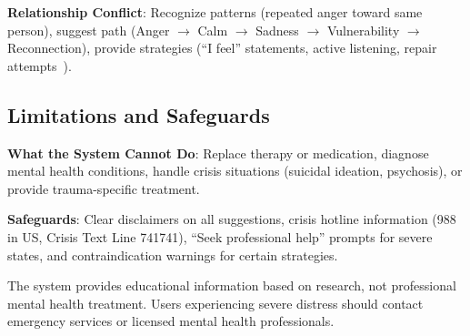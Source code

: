 \textbf{Relationship Conflict}: Recognize patterns (repeated anger toward same person), suggest path (Anger $\rightarrow$ Calm $\rightarrow$ Sadness $\rightarrow$ Vulnerability $\rightarrow$ Reconnection), provide strategies (``I feel'' statements, active listening, repair attempts~\cite{gottman2015}).

\subsection{Limitations and Safeguards}

\textbf{What the System Cannot Do}: Replace therapy or medication, diagnose mental health conditions, handle crisis situations (suicidal ideation, psychosis), or provide trauma-specific treatment.

\textbf{Safeguards}: Clear disclaimers on all suggestions, crisis hotline information (988 in US, Crisis Text Line 741741), ``Seek professional help'' prompts for severe states, and contraindication warnings for certain strategies.

The system provides educational information based on research, not professional mental health treatment. Users experiencing severe distress should contact emergency services or licensed mental health professionals.
